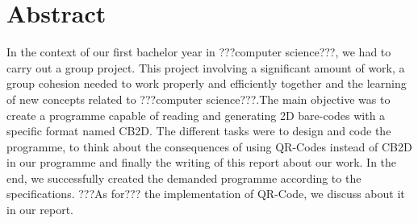 \newpage

\section{Abstract}

%


In the context of our first bachelor year in ???computer science???, we had to carry out a group project. This project involving a significant amount of work, a group cohesion needed to work properly and efficiently together and the learning of new concepts related to ???computer science???.The main objective was to create a programme capable of reading and generating 2D bare-codes with a specific format named CB2D. The different tasks were to design and code the programme, to think about the consequences of using QR-Codes instead of CB2D in our programme and finally the writing of this report about our work. In the end, we successfully created the demanded programme according to the specifications. ???As for??? the implementation of QR-Code, we discuss about it in our report.

